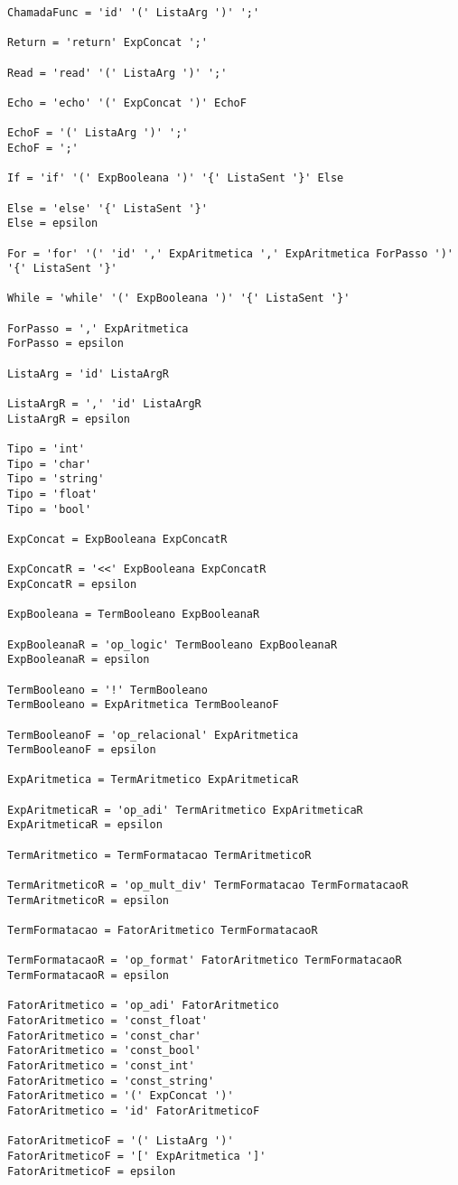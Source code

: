 \documentclass[
  12pt,				%
  oneside,			%
  a4paper,			%
  english,			%
  french,				%
  spanish,			%
  brazil,				%
]{abntex2}
\begin{document}
\begin{lstlisting}[label={code:gramatica-original},caption={Gramática
    original da linguagem de programação LisC.},style={mystyle}]
ChamadaFunc = 'id' '(' ListaArg ')' ';'

Return = 'return' ExpConcat ';'

Read = 'read' '(' ListaArg ')' ';'

Echo = 'echo' '(' ExpConcat ')' EchoF

EchoF = '(' ListaArg ')' ';'
EchoF = ';'

If = 'if' '(' ExpBooleana ')' '{' ListaSent '}' Else

Else = 'else' '{' ListaSent '}'
Else = epsilon

For = 'for' '(' 'id' ',' ExpAritmetica ',' ExpAritmetica ForPasso ')' '{' ListaSent '}'

While = 'while' '(' ExpBooleana ')' '{' ListaSent '}'

ForPasso = ',' ExpAritmetica
ForPasso = epsilon

ListaArg = 'id' ListaArgR

ListaArgR = ',' 'id' ListaArgR
ListaArgR = epsilon

Tipo = 'int'
Tipo = 'char'
Tipo = 'string'
Tipo = 'float'
Tipo = 'bool'

ExpConcat = ExpBooleana ExpConcatR

ExpConcatR = '<<' ExpBooleana ExpConcatR
ExpConcatR = epsilon

ExpBooleana = TermBooleano ExpBooleanaR

ExpBooleanaR = 'op_logic' TermBooleano ExpBooleanaR
ExpBooleanaR = epsilon

TermBooleano = '!' TermBooleano
TermBooleano = ExpAritmetica TermBooleanoF

TermBooleanoF = 'op_relacional' ExpAritmetica
TermBooleanoF = epsilon

ExpAritmetica = TermAritmetico ExpAritmeticaR

ExpAritmeticaR = 'op_adi' TermAritmetico ExpAritmeticaR
ExpAritmeticaR = epsilon

TermAritmetico = TermFormatacao TermAritmeticoR

TermAritmeticoR = 'op_mult_div' TermFormatacao TermFormatacaoR
TermAritmeticoR = epsilon

TermFormatacao = FatorAritmetico TermFormatacaoR

TermFormatacaoR = 'op_format' FatorAritmetico TermFormatacaoR
TermFormatacaoR = epsilon

FatorAritmetico = 'op_adi' FatorAritmetico
FatorAritmetico = 'const_float'
FatorAritmetico = 'const_char'
FatorAritmetico = 'const_bool'
FatorAritmetico = 'const_int'
FatorAritmetico = 'const_string'
FatorAritmetico = '(' ExpConcat ')'
FatorAritmetico = 'id' FatorAritmeticoF

FatorAritmeticoF = '(' ListaArg ')'
FatorAritmeticoF = '[' ExpAritmetica ']'
FatorAritmeticoF = epsilon
\end{lstlisting}
\end{document}
